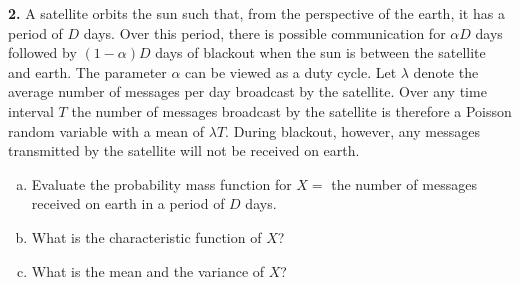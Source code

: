 \textbf{2.} A satellite orbits the sun such that, from the perspective of the earth, it has a period of $D$ days. Over this period, there is possible communication for $\alpha D$ days followed by $(1-\alpha ) D$ days of blackout when the sun is between the satellite and earth. The parameter $\alpha$ can be viewed as a duty cycle. Let $\lambda $ denote the average number of messages per day broadcast by the satellite. Over any time interval $T$ the number of messages broadcast by the satellite is therefore a Poisson random variable with a mean of $\lambda T $. During blackout, however, any messages transmitted by the satellite will not be received on earth.
\begin{enumerate}[(a)]
\item Evaluate the probability mass function for $X=$ the number of messages received on earth in a period of $D$ days.
\item What is the characteristic function of $X$?
\item What is the mean and the variance of $X$?
\end{enumerate}
